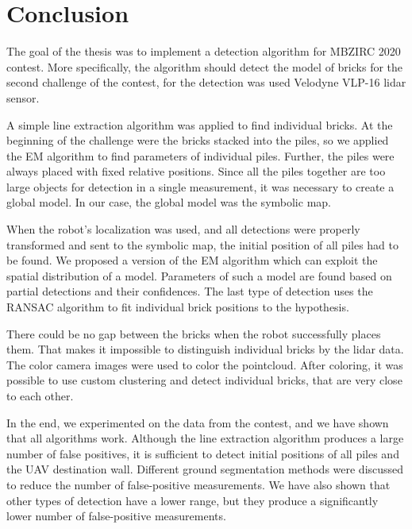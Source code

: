 \chapter{Conclusion}
The goal of the thesis was to implement a detection algorithm for MBZIRC 2020 contest. More specifically, the algorithm should detect the model of bricks for the second challenge of the contest, for the detection was used Velodyne VLP-16 lidar sensor. 

A simple line extraction algorithm was applied to find individual bricks. At the beginning of the challenge were the bricks stacked into the piles, so we applied the EM algorithm to find parameters of individual piles. Further, the piles were always placed with fixed relative positions. Since all the piles together are too large objects for detection in a single measurement, it was necessary to create a global model. In our case, the global model was the symbolic map.

When the robot's localization was used, and all detections were properly transformed and sent to the symbolic map, the initial position of all piles had to be found. We proposed a version of the EM algorithm which can exploit the spatial distribution of a model. Parameters of such a model are found based on partial detections and their confidences. The last type of detection uses the RANSAC algorithm to fit individual brick positions to the hypothesis.

There could be no gap between the bricks when the robot successfully places them. That makes it impossible to distinguish individual bricks by the lidar data. The color camera images were used to color the pointcloud. After coloring, it was possible to use custom clustering and detect individual bricks, that are very close to each other.

In the end, we experimented on the data from the contest, and we have shown that all algorithms work. Although the line extraction algorithm produces a large number of false positives, it is sufficient to detect initial positions of all piles and the UAV destination wall. Different ground segmentation methods were discussed to reduce the number of false-positive measurements. We have also shown that other types of detection have a lower range, but they produce a significantly lower number of false-positive measurements.